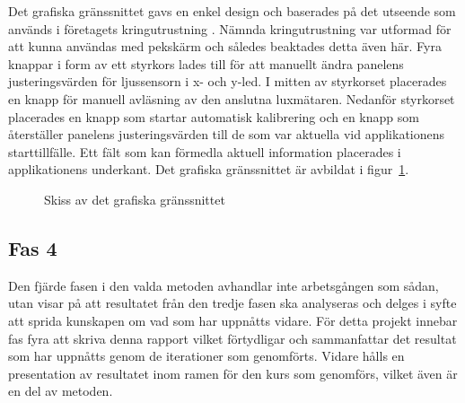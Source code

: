             Det grafiska gränssnittet gavs en enkel design och baserades på det utseende som används i företagets kringutrustning \cite{solarremote}. Nämnda kringutrustning var utformad för att kunna användas med pekskärm och således beaktades detta även här. Fyra knappar i form av ett styrkors lades till för att manuellt ändra panelens justeringsvärden för ljussensorn i x- och y-led. I mitten av styrkorset placerades en knapp för manuell avläsning av den anslutna luxmätaren. Nedanför styrkorset placerades en knapp som startar automatisk kalibrering och en knapp som återställer panelens justeringsvärden till de som var aktuella vid applikationens starttillfälle. Ett fält som kan förmedla aktuell information placerades i applikationens underkant. Det grafiska gränssnittet är avbildat i figur~\ref{fig:app_skiss}.

            \begin{figure}[hb]
                
            \caption{\label{fig:app_skiss} Skiss av det grafiska gränssnittet}
            \end{figure}



    \subsection{Fas 4} %
    \label{sub:fas_4}
        Den fjärde fasen i den valda metoden avhandlar inte arbetsgången som sådan, utan visar på att resultatet från den tredje fasen ska analyseras och delges i syfte att sprida kunskapen om vad som har uppnåtts vidare. 
        För detta projekt innebar fas fyra att skriva denna rapport vilket förtydligar och sammanfattar det resultat som har uppnåtts genom de iterationer som genomförts. Vidare hålls en presentation av resultatet inom ramen för den kurs som genomförs, vilket även är en del av metoden.
